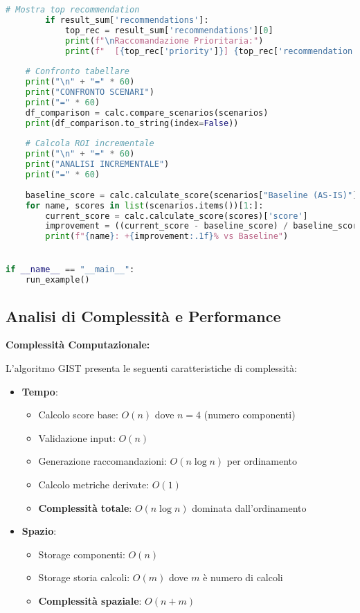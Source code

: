\begin{lstlisting}[language=Python, caption={Implementazione completa GIST Calculator con validazione e reporting}]
        # Mostra top recommendation
        if result_sum['recommendations']:
            top_rec = result_sum['recommendations'][0]
            print(f"\nRaccomandazione Prioritaria:")
            print(f"  [{top_rec['priority']}] {top_rec['recommendation']}")
    
    # Confronto tabellare
    print("\n" + "=" * 60)
    print("CONFRONTO SCENARI")
    print("=" * 60)
    df_comparison = calc.compare_scenarios(scenarios)
    print(df_comparison.to_string(index=False))
    
    # Calcola ROI incrementale
    print("\n" + "=" * 60)
    print("ANALISI INCREMENTALE")
    print("=" * 60)
    
    baseline_score = calc.calculate_score(scenarios["Baseline (AS-IS)"])['score']
    for name, scores in list(scenarios.items())[1:]:
        current_score = calc.calculate_score(scores)['score']
        improvement = ((current_score - baseline_score) / baseline_score) * 100
        print(f"{name}: +{improvement:.1f}% vs Baseline")


if __name__ == "__main__":
    run_example()
\end{lstlisting}

\subsection{\texorpdfstring{Analisi di Complessità e Performance}{C.4.3 - Analisi di Complessità e Performance}}

\textbf{Complessità Computazionale:}

L'algoritmo GIST presenta le seguenti caratteristiche di complessità:

\begin{itemize}
\item \textbf{Tempo}:
  \begin{itemize}
  \item Calcolo score base: $O(n)$ dove $n = 4$ (numero componenti)
  \item Validazione input: $O(n)$
  \item Generazione raccomandazioni: $O(n \log n)$ per ordinamento
  \item Calcolo metriche derivate: $O(1)$
  \item \textbf{Complessità totale}: $O(n \log n)$ dominata dall'ordinamento
  \end{itemize}
  
\item \textbf{Spazio}:
  \begin{itemize}
  \item Storage componenti: $O(n)$
  \item Storage storia calcoli: $O(m)$ dove $m$ è numero di calcoli
  \item \textbf{Complessità spaziale}: $O(n + m)$
  \end{itemize}
\end{itemize}

